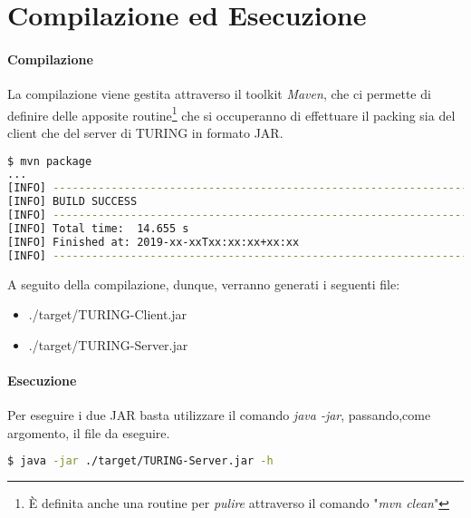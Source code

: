\section{Compilazione ed Esecuzione}
\paragraph{Compilazione}
La compilazione viene gestita attraverso il toolkit \textit{Maven}, che ci permette di definire delle apposite routine\footnote{È definita anche una routine per \textit{pulire} attraverso il comando "\textit{mvn clean}"} che si occuperanno di effettuare il packing sia del client che del server di TURING in formato JAR.

\begin{lstlisting}[language=bash, caption="Compilazione tramite Maven"]
$ mvn package
...
[INFO] ------------------------------------------------------------------------
[INFO] BUILD SUCCESS
[INFO] ------------------------------------------------------------------------
[INFO] Total time:  14.655 s
[INFO] Finished at: 2019-xx-xxTxx:xx:xx+xx:xx
[INFO] ------------------------------------------------------------------------
\end{lstlisting}
\pagebreak
A seguito della compilazione, dunque, verranno generati i seguenti file:
\begin{itemize}
	\item ./target/TURING-Client.jar
	\item ./target/TURING-Server.jar
\end{itemize}

\paragraph{Esecuzione}
Per eseguire i due JAR basta utilizzare il comando \textit{java -jar}, passando,come argomento, il file da eseguire.

\begin{lstlisting}[language=bash, caption="Esempio di esecuzione di TURING-Server.jar]
$ java -jar ./target/TURING-Server.jar -h
\end{lstlisting}

